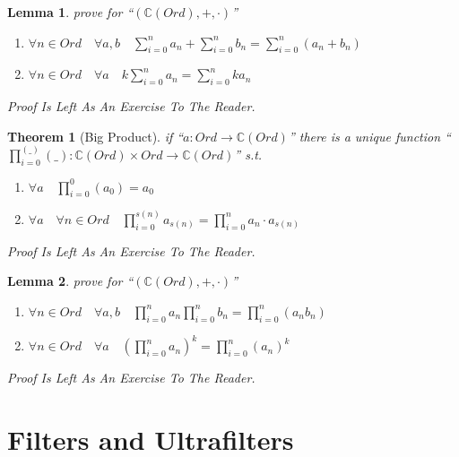 \documentclass[10pt,a4paper]{book}
\newtheorem{theorem}{Theorem}[section]
\newtheorem{lemma}{Lemma}[section]
\begin{document}
\begin{lemma}prove for ``$(\mathbb{C} (Ord) , + , \cdot  )$''
    \begin{enumerate}
        \setlength{\itemsep}{0pt} %
        \item       $\forall n   \in Ord \quad \forall a , b   \quad  \sum_{i = 0}^n a_n + \sum_{i = 0}^n b_n = \sum_{i = 0}^n (a_n + b_n )  $
        \item       $\forall n   \in Ord \quad \forall a   \quad k \sum_{i = 0}^n a_n = \sum_{i = 0}^n ka_n $
    \end{enumerate}
    Proof Is Left As An Exercise To The Reader.
\end{lemma}

\begin{theorem}[Big Product] if ``$a : Ord \to \mathbb{C} (Ord)$'' there is a unique function ``$\prod_{i = 0}^{(\_)} (\_)  :\mathbb{C} (Ord) \times Ord \to \mathbb{C} (Ord)$'' s.t.

    \begin{enumerate}
        \setlength{\itemsep}{0pt} %
        \item       $\forall a \quad  \prod_{i = 0}^0 (a_0)  = a_0$
        \item       $\forall a \quad \forall n \in Ord \quad  \prod_{i = 0}^{s(n)} a_{s(n)} = \prod_{i = 0}^n a_n \cdot a_{s(n)}  $
    \end{enumerate}
    Proof Is Left As An Exercise To The Reader.
\end{theorem}

\begin{lemma}prove for ``$(\mathbb{C} (Ord) , + , \cdot  )$''
    \begin{enumerate}
        \setlength{\itemsep}{0pt} %
        \item       $\forall n   \in Ord \quad \forall a , b   \quad  \prod_{i = 0}^n a_n  \prod_{i = 0}^n b_n = \prod_{i = 0}^n (a_n  b_n )  $
        \item       $\forall n   \in Ord \quad \forall a   \quad  (\prod_{i = 0}^n a_n)^k = \prod_{i = 0}^n (a_n)^k $
    \end{enumerate}
    Proof Is Left As An Exercise To The Reader.
\end{lemma}

\chapter{Filters and Ultrafilters }
\end{document}
